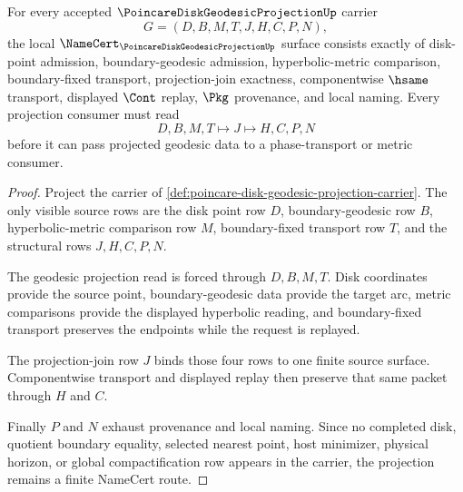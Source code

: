 \begin{theorem}
\label{thm:poincare-disk-geodesic-projection-namecert-obligations}
For every accepted $\PoincareDiskGeodesicProjectionUp$ carrier
$$
G=(D,B,M,T,J,H,C,P,N),
$$
the local $\NameCert_{\PoincareDiskGeodesicProjectionUp}$ surface consists exactly of disk-point admission, boundary-geodesic admission, hyperbolic-metric comparison, boundary-fixed transport, projection-join exactness, componentwise $\hsame$ transport, displayed $\Cont$ replay, $\Pkg$ provenance, and local naming. Every projection consumer must read
$$
D,B,M,T \longmapsto J \longmapsto H,C,P,N
$$
before it can pass projected geodesic data to a phase-transport or metric consumer.
\end{theorem}
\begin{proof}
Project the carrier of \autoref{def:poincare-disk-geodesic-projection-carrier}. The only visible source rows are the disk point row $D$, boundary-geodesic row $B$, hyperbolic-metric comparison row $M$, boundary-fixed transport row $T$, and the structural rows $J,H,C,P,N$.

The geodesic projection read is forced through $D,B,M,T$. Disk coordinates provide the source point, boundary-geodesic data provide the target arc, metric comparisons provide the displayed hyperbolic reading, and boundary-fixed transport preserves the endpoints while the request is replayed.

The projection-join row $J$ binds those four rows to one finite source surface. Componentwise transport and displayed replay then preserve that same packet through $H$ and $C$.

Finally $P$ and $N$ exhaust provenance and local naming. Since no completed disk, quotient boundary equality, selected nearest point, host minimizer, physical horizon, or global compactification row appears in the carrier, the projection remains a finite NameCert route.
\end{proof}

